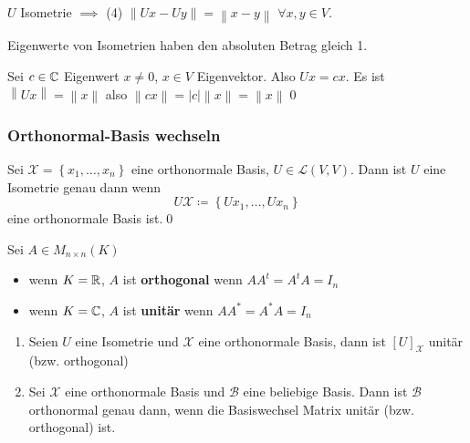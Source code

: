 \begin{subnote}
	$ U $ Isometrie $ \implies $ (4) $ \left\| Ux - Uy \right\| = \left\| x - y \right\|  $ $ \forall x, y \in V $.
\end{subnote}

\begin{subtheorem}
	Eigenwerte von Isometrien haben den absoluten Betrag gleich 1.
\end{subtheorem}
\begin{subproof*}
	Sei $ c \in \mathbb{C}  $ Eigenwert $ x \neq 0 $, $ x \in V $ Eigenvektor.
	Also $ Ux = cx $. Es ist $ \left\| Ux \right\| = \left\| x \right\|  $ also $ \left\| cx \right\| = \left| c \right| \left\| x \right\| = \left\| x \right\|  $\qed
\end{subproof*}

\subsubsection{Orthonormal-Basis wechseln}
\begin{subtheorem}
	Sei $ \mathcal{X} = \left\{ x_1, \dotsc, x_n \right\}  $ eine orthonormale Basis, $ U \in \mathcal{L} (V, V) $.
	Dann ist $ U $ eine Isometrie genau dann wenn
	\[
		U \mathcal{X} \coloneqq \left\{ Ux_1, \dotsc, Ux_n \right\} 
	\]
	eine orthonormale Basis ist.\qed
\end{subtheorem}

\begin{subdefinition}
	Sei $ A \in M_{n \times n} (K) $ 
	\begin{itemize}
		\item wenn $ K = \mathbb{R} $, $ A $ ist \textbf{orthogonal} wenn $ A A^t = A^t A = I_n $ 
		\item wenn $ K = \mathbb{C} $, $ A $ ist \textbf{unitär} wenn $ A A^* = A^* A = I_n $
	\end{itemize}
\end{subdefinition}

\begin{subnote}
	\begin{enumerate}[label=(\roman*)]
		\item Seien $ U $ eine Isometrie und $ \mathcal{X}  $ eine orthonormale Basis, dann ist $ [U]_{\mathcal{X} }  $ unitär (bzw. orthogonal)
		\item Sei $ \mathcal{X}  $ eine orthonormale Basis und $ \mathcal{B}  $ eine beliebige Basis.
			Dann ist $ \mathcal{B}  $ orthonormal genau dann, wenn die Basiswechsel Matrix unitär (bzw. orthogonal) ist.
	\end{enumerate}
\end{subnote}

